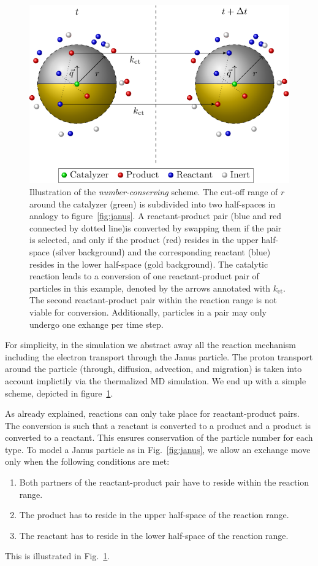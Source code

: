 \documentclass[aip,jcp,reprint,a4paper,onecolumn,nofootinbib,amsmath,amssymb]{revtex4-1}
\begin{document}
\begin{figure}
  \centering
  \includegraphics{FIGURES/number-conserving}
  \caption{\label{fig:nc}Illustration of the \emph{number-conserving} scheme. The cut-off range of $r$ around the catalyzer (green) is subdivided into two half-spaces in analogy to figure~\ref{fig:janus}. A reactant-product pair (blue and red connected by dotted line)is converted by swapping them if the pair is selected, and only if the product (red) resides in the upper half-space (silver background) and the corresponding reactant (blue) resides in the lower half-space (gold background). The catalytic reaction leads to a conversion of one reactant-product pair of particles in this example, denoted by the arrows annotated with $k_{\text{ct}}$. The second reactant-product pair within the reaction range is not viable for conversion. Additionally, particles in a pair may only undergo one exhange per time step.}
\end{figure}

For simplicity, in the simulation we abstract away all the reaction mechanism including the electron transport through the Janus particle. The proton transport around the particle (through, diffusion, advection, and migration) is taken into account implictily via the thermalized MD simulation. We end up with a simple scheme,
depicted in figure~\ref{fig:nc}.

As already explained, reactions can only take place for reactant-product pairs. The conversion is such that a reactant is converted to a product and a product is converted to a reactant. This ensures conservation of the particle number for each type. To model a Janus particle as in Fig.~\ref{fig:janus}, we allow an exchange move only when the following conditions are met:
\begin{enumerate}
\item Both partners of the reactant-product pair have to reside within
  the reaction range.
\item The product has to reside in the upper half-space of the
  reaction range.
\item The reactant has to reside in the lower half-space of the
  reaction range.
\end{enumerate}
This is illustrated in Fig.~\ref{fig:nc}.
\end{document}
